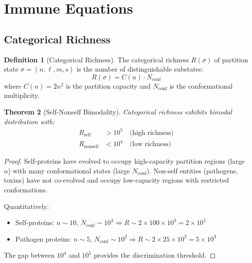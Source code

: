 \documentclass[10pt,twocolumn]{article}
\theoremstyle{plain}
\newtheorem{theorem}{Theorem}[section]
\theoremstyle{definition}
\newtheorem{definition}[theorem]{Definition}
\theoremstyle{remark}
\begin{document}
\section{Immune Equations}
\label{sec:immune}

\subsection{Categorical Richness}

\begin{definition}[Categorical Richness]
\label{def:richness}
The categorical richness $R(\sigma)$ of partition state $\sigma = (n, \ell, m, s)$ is the number of distinguishable substates:
\begin{equation}
R(\sigma) = C(n) \cdot N_{\mathrm{conf}}
\label{eq:richness}
\end{equation}
where $C(n) = 2n^2$ is the partition capacity and $N_{\mathrm{conf}}$ is the conformational multiplicity.
\end{definition}

\begin{theorem}[Self-Nonself Bimodality]
\label{thm:bimodality}
Categorical richness exhibits bimodal distribution with:
\begin{align}
R_{\mathrm{self}} &> 10^5 \quad \text{(high richness)} \\
R_{\mathrm{nonself}} &< 10^4 \quad \text{(low richness)}
\end{align}
\end{theorem}

\begin{proof}
Self-proteins have evolved to occupy high-capacity partition regions (large $n$) with many conformational states (large $N_{\mathrm{conf}}$). Non-self entities (pathogens, toxins) have not co-evolved and occupy low-capacity regions with restricted conformations.

Quantitatively:
\begin{itemize}
\item Self-proteins: $n \sim 10$, $N_{\mathrm{conf}} \sim 10^3 \Rightarrow R \sim 2 \times 100 \times 10^3 = 2 \times 10^5$
\item Pathogen proteins: $n \sim 5$, $N_{\mathrm{conf}} \sim 10^2 \Rightarrow R \sim 2 \times 25 \times 10^2 = 5 \times 10^3$
\end{itemize}
The gap between $10^4$ and $10^5$ provides the discrimination threshold.
\end{proof}
\end{document}
